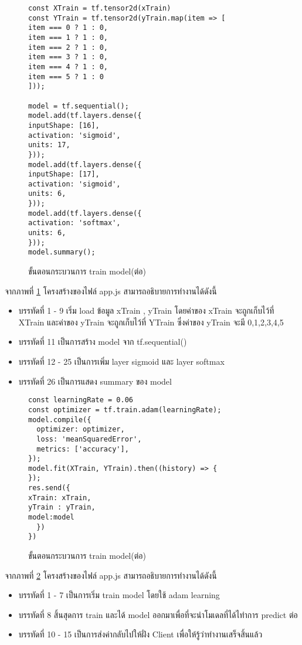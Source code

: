 \begin{figure}[H]
{\begin{lstlisting}
const XTrain = tf.tensor2d(xTrain)
const YTrain = tf.tensor2d(yTrain.map(item => [
item === 0 ? 1 : 0,
item === 1 ? 1 : 0,
item === 2 ? 1 : 0,
item === 3 ? 1 : 0,
item === 4 ? 1 : 0,
item === 5 ? 1 : 0
])); 

model = tf.sequential();
model.add(tf.layers.dense({
inputShape: [16],
activation: 'sigmoid',
units: 17,
}));
model.add(tf.layers.dense({
inputShape: [17],
activation: 'sigmoid',
units: 6,
}));
model.add(tf.layers.dense({
activation: 'softmax',
units: 6,
}));
model.summary();
\end{lstlisting}}
\caption{ขั้นตอนกระบวนการ train model(ต่อ)}
\label{Fig:4-train1}
\end{figure}
\newpage
จากภาพที่ \ref{Fig:4-train1} โครงสร้างของไฟล์ app.js สามารถอธิบายการทำงานได้ดังนี้
\begin{itemize}[label={--}]
\item บรรทัดที่ 1 - 9 เริ่ม load ข้อมูล xTrain , yTrain โดยค่าของ xTrain จะถูกเก็บไว้ที่ XTrain และค่าของ yTrain จะถูกเก็บไว้ที่ YTrain ซึ่งค่าของ yTrain จะมี 0,1,2,3,4,5
\item บรรทัดที่ 11 เป็นการสร้าง model จาก tf.sequential()
\item บรรทัดที่ 12 - 25 เป็นการเพิ่ม layer sigmoid และ layer softmax
\item บรรทัดที่ 26 เป็นการแสดง summary ของ model
\end{itemize}

\begin{figure}[H]
{\begin{lstlisting}
const learningRate = 0.06 
const optimizer = tf.train.adam(learningRate);
model.compile({
  optimizer: optimizer,
  loss: 'meanSquaredError', 
  metrics: ['accuracy'],
});
model.fit(XTrain, YTrain).then((history) => {
});
res.send({
xTrain: xTrain,
yTrain : yTrain,
model:model
  })
})
\end{lstlisting}}
\caption{ขั้นตอนกระบวนการ train model(ต่อ)}
\label{Fig:4-train2}
\end{figure}

จากภาพที่ \ref{Fig:4-train2} โครงสร้างของไฟล์ app.js สามารถอธิบายการทำงานได้ดังนี้
\begin{itemize}[label={--}]
\item บรรทัดที่ 1 - 7 เป็นการเริ่ม train model โดยใช้ adam learning
\item บรรทัดที่ 8 สิ้นสุดการ train และได้ model ออกมาเพื่อที่จะนำโมเดลที่ได้ไทำการ predict ต่อ
\item บรรทัดที่ 10 - 15 เป็นการส่งค่ากลับไปให้ฝั่ง Client เพื่อให้รู้ว่าทำงานเสร็จสิ้นแล้ว 
\end{itemize}
\newpage


